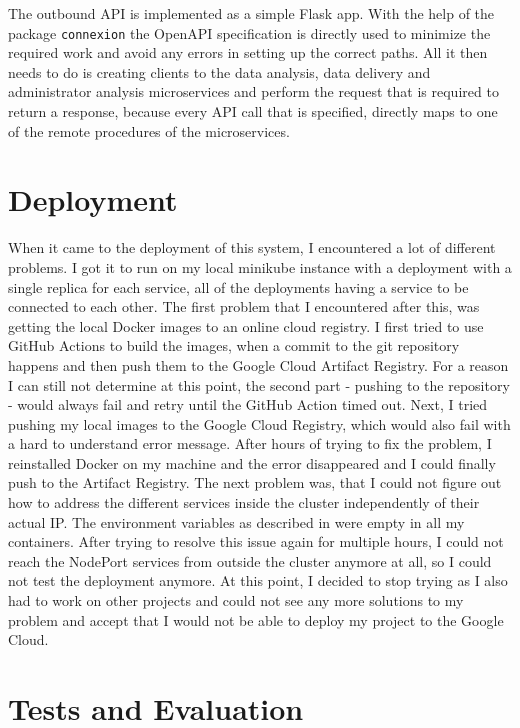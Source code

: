 \documentclass[11pt]{article}
\begin{document}
	The outbound API is implemented as a simple Flask app. With the help of the package \texttt{connexion} the OpenAPI specification is directly used to minimize the required work and avoid any errors in setting up the correct paths. All it then needs to do is creating clients to the data analysis, data delivery and administrator analysis microservices and perform the request that is required to return a response, because every API call that is specified, directly maps to one of the remote procedures of the microservices.
	
	\section{Deployment}
	
	When it came to the deployment of this system, I encountered a lot of different problems. I got it to run on my local minikube instance with a deployment with a single replica for each service, all of the deployments having a service to be connected to each other. The first problem that I encountered after this, was getting the local Docker images to an online cloud registry. I first tried to use GitHub Actions to build the images, when a commit to the git repository happens and then push them to the Google Cloud Artifact Registry. For a reason I can still not determine at this point, the second part - pushing to the repository - would always fail and retry until the GitHub Action timed out. Next, I tried pushing my local images to the Google Cloud Registry, which would also fail with a hard to understand error message. After hours of trying to fix the problem, I reinstalled Docker on my machine and the error disappeared and I could finally push to the Artifact Registry. The next problem was, that I could not figure out how to address the different services inside the cluster independently of their actual IP. The environment variables as described in \cite{env_variables2022} were empty in all my containers. After trying to resolve this issue again for multiple hours, I could not reach the NodePort services from outside the cluster anymore at all, so I could not test the deployment anymore. At this point, I decided to stop trying as I also had to work on other projects and could not see any more solutions to my problem and accept that I would not be able to deploy my project to the Google Cloud.
	
	\section{Tests and Evaluation}
	
\end{document}
